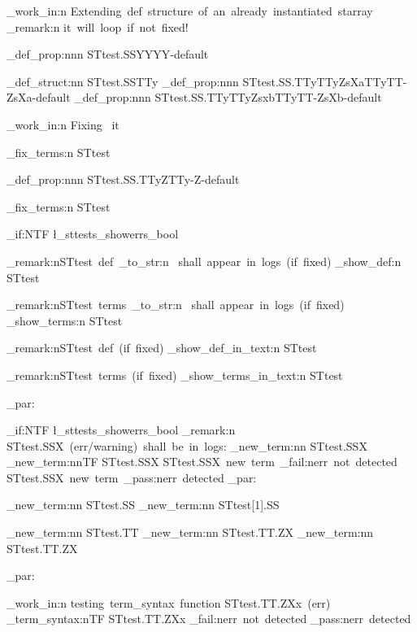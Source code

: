 \documentclass{article}
\begin{document}
\sttests_work_in:n {Extending~def~structure~of~an~already~instantiated~starray}
\sttests_remark:n {it~will~loop~if~not~fixed!}

\starray_def_prop:nnn {STtest.SS}{YY}{YY-default}




\starray_def_struct:nn {STtest.SS}{TTy}
\starray_def_prop:nnn {STtest.SS.TTy}{TTyZsXa}{TTyTT-ZsXa-default}
\starray_def_prop:nnn {STtest.SS.TTy}{TTyZsxb}{TTyTT-ZsXb-default}

\sttests_work_in:n {Fixing ~it}

\starray_fix_terms:n {STtest}

\starray_def_prop:nnn {STtest.SS.TTy}{Z}{TTy-Z-default}

\starray_fix_terms:n {STtest}

\bool_if:NTF \l_sttests_showerrs_bool
  {
    \sttests_remark:n{STtest~def~\tl_to_str:n {\show}~shall~appear~in~logs~(if~fixed)}
    \starray_show_def:n {STtest}
    
    \sttests_remark:n{STtest~terms~\tl_to_str:n {\show}~shall~appear~in~logs~(if~fixed)}
    \starray_show_terms:n {STtest}
  }
  {
    \sttests_remark:n{STtest~def~(if~fixed)}
    \starray_show_def_in_text:n {STtest}
    
    \sttests_remark:n{STtest~terms~(if~fixed)}
    \starray_show_terms_in_text:n {STtest}
  }
\sttests_par:

\bool_if:NTF \l_sttests_showerrs_bool
  {
    \sttests_remark:n {STtest.SSX~(err/warning)~shall~be~in~logs:}
    \starray_new_term:nn {STtest.SSX}{}
  }
  {
    \starray_new_term:nnTF {STtest.SSX}{}
      {STtest.SSX~new~term~\sttests_fail:n{err~not~detected}}
      {STtest.SSX~new~term~\sttests_pass:n{err~detected}}
  }
\sttests_par:

        \starray_new_term:nn {STtest.SS}{}
        \starray_new_term:nn {STtest[1].SS}{}

        \starray_new_term:nn {STtest.TT}{}
        \starray_new_term:nn {STtest.TT.ZX}{}
        \starray_new_term:nn {STtest.TT.ZX}{}

\sttests_par:

\sttests_work_in:n {testing~term_syntax~function}
STtest.TT.ZXx~(err)~
\starray_term_syntax:nTF {STtest.TT.ZXx}
  {\sttests_fail:n{err~not~detected}}
  {\sttests_pass:n{err~detected}}
\end{document}
